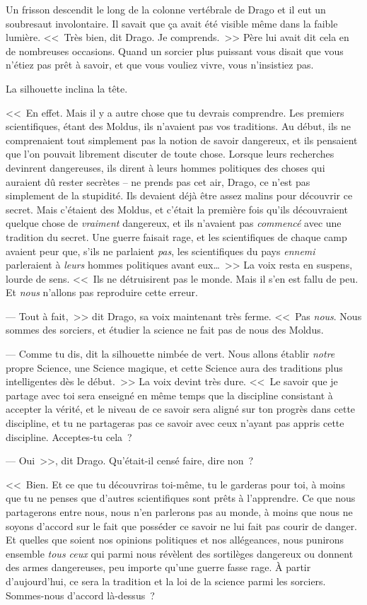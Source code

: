 Un frisson descendit le long de la colonne vertébrale de Drago et il eut un soubresaut involontaire. Il savait que ça avait été visible même dans la faible lumière. <<~Très bien, dit Drago. Je comprends.~>> Père lui avait dit cela en de nombreuses occasions. Quand un sorcier plus puissant vous disait que vous n'étiez pas prêt à savoir, et que vous vouliez vivre, vous n'insistiez pas.

La silhouette inclina la tête.

<<~En effet. Mais il y a autre chose que tu devrais comprendre. Les premiers scientifiques, étant des Moldus, ils n'avaient pas vos traditions. Au début, ils ne comprenaient tout simplement pas la notion de savoir dangereux, et ils pensaient que l'on pouvait librement discuter de toute chose. Lorsque leurs recherches devinrent dangereuses, ils dirent à leurs hommes politiques des choses qui auraient dû rester secrètes -- ne prends pas cet air, Drago, ce n'est pas simplement de la stupidité. Ils devaient déjà être assez malins pour découvrir ce secret. Mais c'étaient des Moldus, et c'était la première fois qu'ils découvraient quelque chose de \emph{vraiment} dangereux, et ils n'avaient pas \emph{commencé} avec une tradition du secret. Une guerre faisait rage, et les scientifiques de chaque camp avaient peur que, s'ils ne parlaient \emph{pas}, les scientifiques du pays \emph{ennemi} parleraient à \emph{leurs} hommes politiques avant eux…~>> La voix resta en suspens, lourde de sens. <<~Ils ne détruisirent pas le monde. Mais il s'en est fallu de peu. Et \emph{nous} n'allons pas reproduire cette erreur.

--- Tout à fait,~>> dit Drago, sa voix maintenant très ferme. <<~Pas \emph{nous}. Nous sommes des sorciers, et étudier la science ne fait pas de nous des Moldus.

--- Comme tu dis, dit la silhouette nimbée de vert. Nous allons établir \emph{notre} propre Science, une Science magique, et cette Science aura des traditions plus intelligentes dès le début.~>> La voix devint très dure. <<~Le savoir que je partage avec toi sera enseigné en même temps que la discipline consistant à accepter la vérité, et le niveau de ce savoir sera aligné sur ton progrès dans cette discipline, et tu ne partageras pas ce savoir avec ceux n'ayant pas appris cette discipline. Acceptes-tu cela~?

--- Oui~>>, dit Drago. Qu'était-il censé faire, dire non~?

<<~Bien. Et ce que tu découvriras toi-même, tu le garderas pour toi, à moins que tu ne penses que d'autres scientifiques sont prêts à l'apprendre. Ce que nous partagerons entre nous, nous n'en parlerons pas au monde, à moins que nous ne soyons d'accord sur le fait que posséder ce savoir ne lui fait pas courir de danger. Et quelles que soient nos opinions politiques et nos allégeances, nous punirons ensemble \emph{tous ceux} qui parmi nous révèlent des sortilèges dangereux ou donnent des armes dangereuses, peu importe qu'une guerre fasse rage. À partir d'aujourd'hui, ce sera la tradition et la loi de la science parmi les sorciers. Sommes-nous d'accord là-dessus~?

